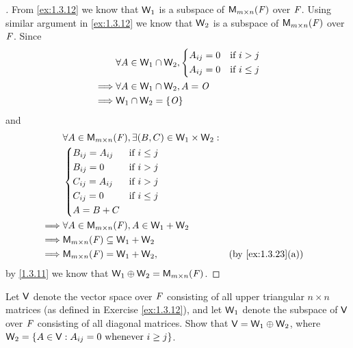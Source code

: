\begin{proof}[]
  From \cref{ex:1.3.12} we know that \(\mathsf{W}_1\) is a subspace of \(\ms\) over \(\mathit{F}\).
  Using similar argument in \cref{ex:1.3.12} we know that \(\mathsf{W}_2\) is a subspace of \(\ms\) over \(\mathit{F}\).
  Since
  \begin{align*}
             & \forall A \in \mathsf{W}_1 \cap \mathsf{W}_2, \begin{dcases}
                                               A_{i j} = 0 & \text{if } i > j    \\
                                               A_{i j} = 0 & \text{if } i \leq j
                                             \end{dcases} \\
    \implies & \forall A \in \mathsf{W}_1 \cap \mathsf{W}_2, A = \mathit{O}                           \\
    \implies & \mathsf{W}_1 \cap \mathsf{W}_2 = \left\lbrace\mathit{O}\right\rbrace
  \end{align*}
  and
  \begin{align*}
             & \forall A \in \ms, \exists (B, C) \in \W_1 \times \W_2 :                        \\
             & \begin{dcases}
                 B_{i j} = A_{i j} & \text{if } i \leq j \\
                 B_{i j} = 0       & \text{if } i > j    \\
                 C_{i j} = A_{i j} & \text{if } i > j    \\
                 C_{i j} = 0       & \text{if } i \leq j \\
                 A = B + C
               \end{dcases}                                         \\
    \implies & \forall A \in \ms, A \in \W_1 + \W_2                                            \\
    \implies & \ms \subseteq \W_1 + \W_2                                                       \\
    \implies & \ms = \W_1 + \W_2,                                       &  & \by{ex:1.3.23}[a]
  \end{align*}
  by \cref{1.3.11} we know that \(\W_1 \oplus \W_2 = \ms\).
\end{proof}

\begin{ex}\label{ex:1.3.27}
  Let \(\mathsf{V}\) denote the vector space over \(\mathit{F}\) consisting of all upper triangular \(n \times n\) matrices (as defined in Exercise \cref{ex:1.3.12}), and let \(\mathsf{W}_1\) denote the subspace of \(\mathsf{V}\) over \(\mathit{F}\) consisting of all diagonal matrices.
  Show that \(\mathsf{V} = \mathsf{W}_1 \oplus \mathsf{W}_2\), where \(\mathsf{W}_2 = \left\lbrace A \in \mathsf{V} : A_{i j} = 0 \text{ whenever } i \geq j\right\rbrace\).
\end{ex}

